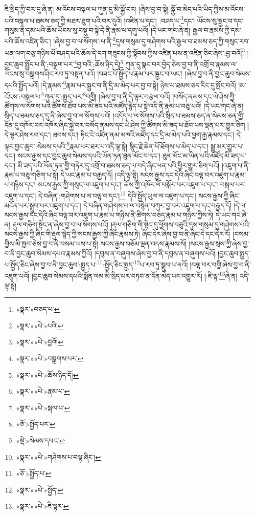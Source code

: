 ཇི་སྲིད་ཀྱི་བར་དུ་ཞེ་ན། མ་འོངས་བསྐལ་པ་ཀུན་དུ་མི་སྐྱོ་བར། །ཞེས་བྱ་བ་སྟེ། སྐྱོ་བ་མེད་པའི་ཡིད་ཀྱིས་མ་འོངས་པའི་བསྐལ་པ་ཐམས་ཅད་ཀྱི་མཐར་ཐུག་པའི་བར་དུའོ། །འཛིན་པ་དང་། :བཤད་པ་\footnote{«སྣར་»བཅད་པ་}དང་། ཡོངས་སུ་སྦྱང་བ་དང་གསུམ་ནི་དམ་པའི་ཆོས་ཡོངས་སུ་བསྡུ་བ་སྟེ་དེ་ནི་རྣམ་པ་དགུ་པའོ། །དེ་ཡང་གང་ཞེ་ན། རྒྱལ་བ་རྣམས་ཀྱི་དམ་པའི་ཆོས་འཛིན་ཅིང་། །ཞེས་བྱ་བ་ལ་སོགས་:པ་ནི་\footnote{«སྣར་»«པེ་»པའི་}དུས་གསུམ་དུ་གཤེགས་པའི་རྒྱལ་བ་ཐམས་ཅད་ཀྱི་གསུང་རབ་ཡན་ལག་བཅུ་གཉིས་པོ་བཤད་པའི་ཆོས་དེ་དག་གཟུངས་ཀྱི་སྟོབས་ཀྱིས་འཛིན་པས་ན་འཛིན་ཅིང་ཞེས་:བྱ་བའོ།\footnote{«སྣར་»«པེ་»བྱའོ།} །བྱང་ཆུབ་སྤྱོད་པ་ནི་:བསྒྲག་པར་\footnote{«སྣར་»«པེ་»བསྒྲགས་པར་}བྱ་བའི་:ཆོས་ཉིད་དེ།\footnote{«སྣར་»«པེ་»ཆོས་ཉིད་དོ།} ཀུན་དུ་སྣང་བར་བྱེད་ཅེས་བྱ་བ་ནི་འགྲོ་བ་རྣམས་ལ་ཡོངས་སུ་བསྒྲགས་ཤིང་རབ་ཏུ་བསྟན་པའོ། །བཟང་པོ་སྤྱོད་པ་རྣམ་པར་སྦྱང་བ་ཡང་། །ཞེས་བྱ་བ་ནི་བྱང་ཆུབ་སེམས་དཔའི་སྤྱོད་པའོ། །དེ་རྣམས་\footnote{«སྣར་»«པེ་»རྣམ་པ་}རྣམ་པར་སྦྱང་བ་ནི་དྲི་མ་མེད་པར་བྱ་བ་སྟེ། ཉེས་པ་ཐམས་ཅད་རིང་དུ་སྤོང་བའོ། །མ་འོངས་:བསྐལ་པ་\footnote{«སྣར་»«པེ་»སྐལ་པ་}ཀུན་དུ་:སྤྱད་པར་\footnote{«ཅོ་»སྤྱོད་པར་}བགྱི། །ཞེས་བྱ་བ་ནི་དེ་ལྟར་བརྩལ་བའོ། །བསོད་ནམས་དང་ཡེ་ཤེས་ཀྱི་ཚོགས་ལ་སོགས་པའི་ཚོགས་ཐོབ་པས་མི་ཟད་པའི་མཛོད་རྙེད་པ་སྟེ་འདི་ནི་རྣམ་པ་བཅུ་པའོ། །དེ་ཡང་གང་ཞེ་ན། སྲིད་པ་ཐམས་ཅད་དུ་ནི་ཞེས་བྱ་བ་ལ་སོགས་པའོ། །འདོད་པ་ལ་སོགས་པའི་སྲིད་པ་ཐམས་ཅད་ན་སེམས་ཅན་གྱི་དོན་དུ་འཁོར་བར་འཁོར་ཞིང་སྐྱེ་བར་བསོད་ནམས་དང་ཡེ་ཤེས་ཀྱི་ཚོགས་མི་ཟད་པ་ཐོབ་པས་ལྡན་པར་གྱུར་ཅིག །དེ་ལྟར་ཤེས་རབ་དང་། ཐབས་དང་། ཏིང་ངེ་འཛིན་ནམ་མཁའི་མཛོད་དང་དྲི་མ་མེད་པའི་ཕྱག་རྒྱ་རྣམས་དང་། དེ་ལྟར་བྱང་ཆུབ་:སེམས་དཔའི་\footnote{«སྡེ་»སེམས་དཔའ་}རྣམ་པར་ཐར་པ་འདི་ལྟ་སྟེ། སྙིང་རྗེ་ཆེན་པོ་ཐོགས་པ་མེད་པ་དང་། སྒྱུ་མར་གྱུར་པ་དང་། སངས་རྒྱས་དང་བྱང་ཆུབ་སེམས་དཔའི་ཡོན་ཏན་ཐུན་མོང་བ་དང་། ཐུན་མོང་མ་ཡིན་པའི་མཛོད་མི་ཟད་པ་དང་། མི་ཟད་པའི་ཡོན་ཏན་གྱི་གཏེར་དུ་འགྲོ་བ་ཐམས་ཅད་ལ་བདེ་ཞིང་ཕན་པའི་ཕྱིར་གྱུར་ཅིག་པའོ། །འཇུག་པ་ནི་རྣམ་པ་བཅུ་གཅིག་པ་སྟེ། དེ་ཡང་རྣམ་པ་བརྒྱད་དོ། །འདི་ལྟ་སྟེ། སངས་རྒྱས་དང་དེའི་ཞིང་བལྟ་བར་འཇུག་པ་རྣམ་པ་གཉིས་དང་། སངས་རྒྱས་ཀྱི་གསུང་ལ་འཇུག་པ་དང་། ཆོས་ཀྱི་འཁོར་ལོ་བསྐོར་བར་འཇུག་པ་དང་། བསྐལ་པར་འཇུག་པ་དང་། དེ་བཞིན་:གཤེགས་པ་ལ་བལྟ་བ་དང་།\footnote{«སྣར་»«པེ་»གཤེགས་པ་བལྟ་ཞིང་།} དེའི་སྤྱོད་ཡུལ་ལ་འཇུག་པ་དང་། སངས་རྒྱས་ཀྱི་ཞིང་མངོན་པར་སྒྲུབ་པར་འཇུག་པ་དང་། དེ་བཞིན་གཤེགས་པ་ལ་བསྙེན་བཀུར་བྱ་བར་འཇུག་པ་དང་བརྒྱད་དོ། །དེ་ལ་སངས་རྒྱས་དང་དེའི་ཞིང་བལྟ་བར་འཇུག་པ་རྣམ་པ་གཉིས་ནི་ཚིགས་བཅད་རྣམ་པ་གཉིས་ཀྱིས་ཏེ། དེ་ཡང་གང་ཞེ་ན། རྡུལ་གཅིག་སྟེང་ན་ཞེས་བྱ་བ་ལ་སོགས་པའོ། །རྡུལ་གཅིག་གི་སྟེང་དུ་ཕྱོགས་བཅུའི་དུས་གསུམ་དུ་གཤེགས་པའི་སངས་རྒྱས་ཀྱི་ཞིང་གི་རྡུལ་སྙེད་ཀྱི་སངས་རྒྱས་ཀྱི་ཞིང་རྣམས་ཏེ། ཞིང་དེར་ཞེས་བྱ་བ་ནི་ཞིང་དེ་དང་དེར་རོ། །བསམ་གྱིས་མི་ཁྱབ་ཅེས་བྱ་བ་ནི་བསམ་ཡས་པ་སྟེ། སངས་རྒྱས་བཅོམ་ལྡན་འདས་རྣམས་སོ། །སངས་རྒྱས་སྲས་ཀྱི་ཞེས་བྱ་བ་ནི་བྱང་ཆུབ་སེམས་དཔའ་རྣམས་ཀྱིའོ། །དབུས་ན་བཞུགས་ཞེས་བྱ་བ་ནི་དབུས་ན་བཞུགས་པའོ། །བྱང་ཆུབ་སྤྱད་པ་སྤྱོད་ཅིང་ཞེས་བྱ་བ་ནི་བྱང་ཆུབ་:སྤྱད་པ་\footnote{«ཅོ་»སྤྱོད་པ་}:སྤྱོད་ཅིང་སྤྱད་\footnote{«སྣར་»«པེ་»སྤྱོད་}པ་རབ་ཏུ་སྒྲུབ་པ་ནའོ། །བལྟ་བར་བགྱི་ཞེས་བྱ་བ་ནི་འཇུག་པའོ། །བྱང་ཆུབ་སེམས་དཔའི་སྨོན་ལམ་མི་སྲིད་པར་བཏབ་ན་དོན་མེད་པར་འགྱུར་རོ། །:ཇི་ལྟ་\footnote{«སྣར་»«པེ་»ཇི་ལྟར་}ཞེ་ན། འདི་ལྟ་སྟེ། 